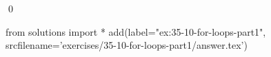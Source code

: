 
\begin{ex}
  \label{ex:35-10-for-loops-part1}
  
  \qed
\end{ex}
\begin{python0}
from solutions import *
add(label="ex:35-10-for-loops-part1",
    srcfilename='exercises/35-10-for-loops-part1/answer.tex')
\end{python0}
